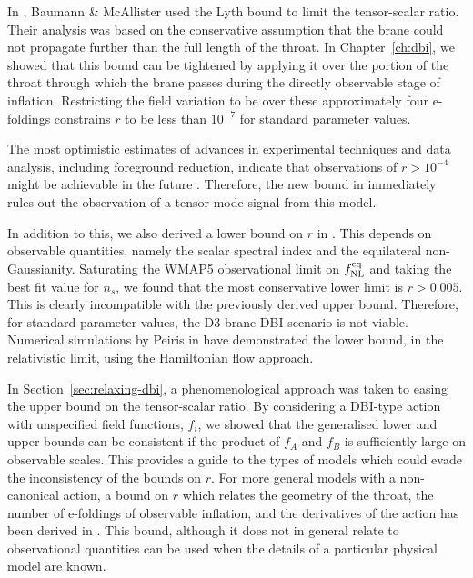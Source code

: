 In , Baumann \& McAllister used the Lyth bound \cite{lyth} to limit
the tensor-scalar ratio. Their analysis was based on the conservative assumption that the brane
could
not propagate further than the full length of the throat. In Chapter~\ref{ch:dbi},
we showed that this bound can be tightened by applying it over the
portion of the throat through which the brane passes during the directly observable
stage of inflation. Restricting the field variation to be over these
approximately four e-foldings constrains $r$ to be less than $10^{-7}$ for standard
parameter values.

The most optimistic estimates of advances in experimental techniques and data
analysis, including foreground reduction, indicate that observations of $r>10^{-4}$
might be achievable in the future \cite{Baumann:2008aq,vpj}. Therefore, the new bound in
 immediately rules out the observation of a tensor mode signal
from this model.

In addition to this, we also derived a lower bound on $r$ in .
This depends on observable quantities, namely the scalar spectral index and the
equilateral non-Gaussianity. Saturating the WMAP5 observational limit on $f_{\mathrm{NL}}^{\mathrm{eq}}$
and taking the best fit value for $n_s$, we found that the most conservative lower
limit is $r>0.005$. This is clearly incompatible with the previously derived upper
bound. Therefore, for standard parameter values, the D3-brane DBI scenario is not
viable. Numerical simulations by Peiris \etal in  have
demonstrated the lower bound, in the relativistic limit, using the
Hamiltonian flow approach.


In Section~\ref{sec:relaxing-dbi}, a phenomenological approach was taken to easing
the upper bound on the tensor-scalar ratio. By considering a DBI-type action with unspecified field
functions,
$f_i$, we showed that the generalised lower and upper bounds can be consistent
if the product of $f_A$ and $f_B$ is sufficiently large on observable scales. This provides a guide
to the types of models which could evade the inconsistency of the bounds on $r$. For more general
models with a non-canonical action, a bound on $r$ which relates the geometry of the throat, the
number of e-foldings of observable inflation, and the derivatives of the action has been derived in
. This bound, although it does not in general relate to observational quantities can
be used when the details of a particular physical model are known.


